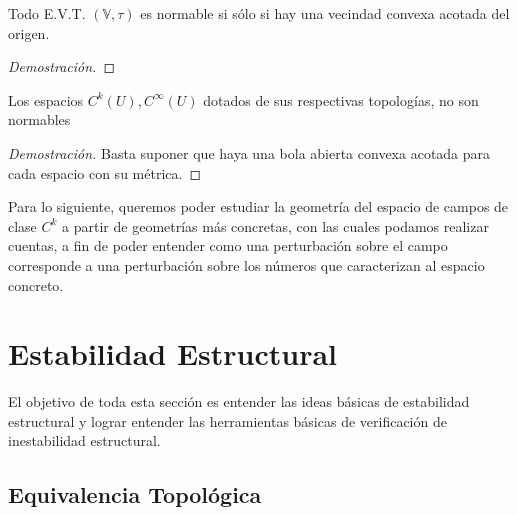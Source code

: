 \begin{thm}
	Todo E.V.T. $(\mathbb{V},\tau)$ es normable si sólo si hay una vecindad convexa acotada del origen.
\end{thm}

\begin{proof}[Demostración]
	
\end{proof}

\begin{prop}
	Los espacios $C^k(U), C^\infty(U)$ dotados de sus respectivas topologías, no son normables
\end{prop}

\begin{proof}[Demostración]
	Basta suponer que haya una bola abierta convexa acotada para cada espacio con su métrica. 
\end{proof}



\begin{rmrk}
	Para lo siguiente, queremos poder estudiar la geometría del espacio de campos de clase $C^k$ a partir de geometrías más concretas, con las cuales podamos realizar cuentas, a fin de poder entender como una perturbación sobre el campo corresponde a una perturbación sobre los números que caracterizan al espacio concreto. 
\end{rmrk}





\section{Estabilidad Estructural}

El objetivo de toda esta sección es entender las ideas básicas de estabilidad estructural y lograr entender las herramientas básicas de verificación de inestabilidad estructural.

\subsection{Equivalencia Topológica}

